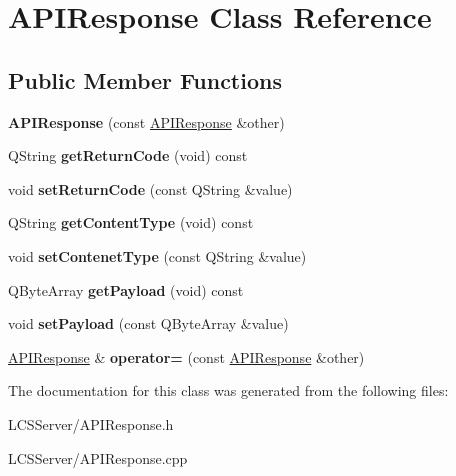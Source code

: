 \hypertarget{class_a_p_i_response}{}\section{A\+P\+I\+Response Class Reference}
\label{class_a_p_i_response}
\subsection*{Public Member Functions}
\begin{DoxyCompactItemize}
\item 
\mbox{\label{class_a_p_i_response_ad9f5238fb178a139f7d90f0024c094bd}} 
{\bfseries A\+P\+I\+Response} (const \hyperlink{class_a_p_i_response}{A\+P\+I\+Response} \&other)
\item 
\mbox{\label{class_a_p_i_response_a0ac0de9b5ec19f313d1571936d88c2f1}} 
Q\+String {\bfseries get\+Return\+Code} (void) const
\item 
\mbox{\label{class_a_p_i_response_a4c749e490345ac4d497678d2272dd5f0}} 
void {\bfseries set\+Return\+Code} (const Q\+String \&value)
\item 
\mbox{\label{class_a_p_i_response_a6861e22ef4409885114aac404760daeb}} 
Q\+String {\bfseries get\+Content\+Type} (void) const
\item 
\mbox{\label{class_a_p_i_response_a67c8ba2ac3155ae8472f453a36f469f5}} 
void {\bfseries set\+Contenet\+Type} (const Q\+String \&value)
\item 
\mbox{\label{class_a_p_i_response_ae58db2525b25db3b244a71c8d10b6b98}} 
Q\+Byte\+Array {\bfseries get\+Payload} (void) const
\item 
\mbox{\label{class_a_p_i_response_a7b36f0565b798ad4740f83b58488f079}} 
void {\bfseries set\+Payload} (const Q\+Byte\+Array \&value)
\item 
\mbox{\label{class_a_p_i_response_a6c757d09db4b79b845b4ecc699c87905}} 
\hyperlink{class_a_p_i_response}{A\+P\+I\+Response} \& {\bfseries operator=} (const \hyperlink{class_a_p_i_response}{A\+P\+I\+Response} \&other)
\end{DoxyCompactItemize}


The documentation for this class was generated from the following files\+:\begin{DoxyCompactItemize}
\item 
L\+C\+S\+Server/A\+P\+I\+Response.\+h\item 
L\+C\+S\+Server/A\+P\+I\+Response.\+cpp\end{DoxyCompactItemize}
